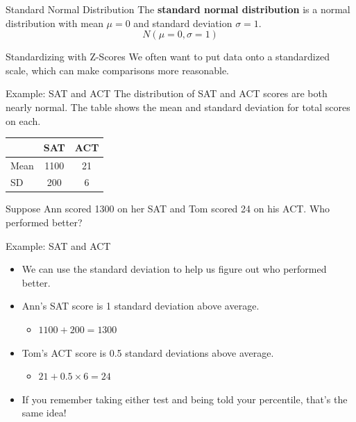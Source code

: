 \begin{frame}{Standard Normal Distribution}
    The \textbf{standard normal distribution} is a normal distribution with mean $\mu=0$ and standard deviation $\sigma=1$.
    \[
        N(\mu=0, \sigma=1)
    \]
\end{frame}

\begin{frame}{Standardizing with Z-Scores}
    We often want to put data onto a standardized scale, which can make comparisons more reasonable.
\end{frame}

\begin{frame}{Example: SAT and ACT}
    The distribution of SAT and ACT scores are both nearly normal. The table shows the mean and standard deviation for total scores on each. 
    \begin{center}
        \begin{tabular}{l cc}
            \hline
            & SAT & ACT  \\
            \hline
            Mean & 1100 & 21 \\
            SD & 200 & 6 \\
            \hline
        \end{tabular}
    \end{center}
    Suppose Ann scored 1300 on her SAT and Tom scored 24 on his ACT. Who performed better?
\end{frame}

\begin{frame}{Example: SAT and ACT}
    \begin{itemize}
        \item We can use the standard deviation to help us figure out who performed better.
        \item Ann's SAT score is 1 standard deviation above average.
        \begin{itemize}
            \item $1100 + 200 = 1300$
        \end{itemize}
        \item Tom's ACT score is 0.5 standard deviations above average.
        \begin{itemize}
            \item $21 + 0.5 \times 6 = 24$
        \end{itemize}
        \item If you remember taking either test and being told your percentile, that's the same idea!
    \end{itemize}
\end{frame}

